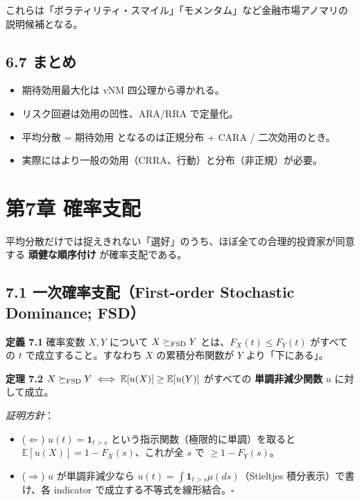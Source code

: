 \documentclass[11pt,a4paper]{report}
\begin{document}
これらは「ボラティリティ・スマイル」「モメンタム」など金融市場アノマリの説明候補となる。

\section{6.7 まとめ}

\begin{itemize}
\item 期待効用最大化は vNM 四公理から導かれる。
\item リスク回避は効用の凹性、ARA/RRA で定量化。
\item 平均分散 = 期待効用 となるのは正規分布 + CARA / 二次効用のとき。
\item 実際にはより一般の効用（CRRA、行動）と分布（非正規）が必要。
\end{itemize}

\noindent\hrulefill

\chapter{第7章 確率支配}

平均分散だけでは捉えきれない「選好」のうち、ほぼ全ての合理的投資家が同意する \textbf{頑健な順序付け} が確率支配である。

\section{7.1 一次確率支配（First-order Stochastic Dominance; FSD）}

\textbf{定義 7.1} 確率変数 $X, Y$ について $X \succeq_{\rm FSD} Y$ とは、$F_X(t) \le F_Y(t)$ がすべての $t$ で成立すること。すなわち $X$ の累積分布関数が $Y$ より「下にある」。

\textbf{定理 7.2} $X \succeq_{\rm FSD} Y \iff \mathbb{E}[u(X)] \ge \mathbb{E}[u(Y)]$ がすべての \textbf{単調非減少関数} $u$ に対して成立。

\emph{証明方針}：
\begin{itemize}
\item ($\Leftarrow$) $u(t) = \mathbf{1}_{t > s}$ という指示関数（極限的に単調）を取ると $\mathbb{E}[u(X)] = 1 - F_X(s)$、これが全 $s$ で $\ge 1 - F_Y(s)$。
\item ($\Rightarrow$) $u$ が単調非減少なら $u(t) = \int \mathbf{1}_{t > s} \mu(ds)$（Stieltjes 積分表示）で書け、各 indicator で成立する不等式を線形結合。$\square$
\end{itemize}
\end{document}
